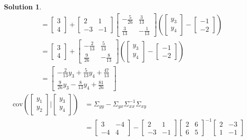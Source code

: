 \documentclass[11pt]{article}
\newtheorem{sol}{Solution}
\begin{document}
\begin{sol}
\begin{align*}
		&= \left[\begin{array}{c} 3\\ 4\end{array}\right] + \left[\begin{array}{cc} 2& 1\\ -3&-1 \end{array}\right]\left[\begin{array}{cc} -\frac{5}{26}& \frac{3}{13}\\ \frac{3}{13}&-\frac{1}{13} \end{array}\right](\left[\begin{array}{c} y_3\\ y_4\end{array}\right] - \left[\begin{array}{c} -1\\ -2\end{array}\right])\\
		&= \left[\begin{array}{c} 3\\ 4\end{array}\right] +  \left[\begin{array}{cc}-\frac{2}{13} & \frac{5}{13}\\ \frac{9}{26}&-\frac{8}{13} \end{array}\right](\left[\begin{array}{c} y_3\\ y_4\end{array}\right] - \left[\begin{array}{c} -1\\ -2\end{array}\right])\\
		&= \left[\begin{array}{c} -\frac{2}{13}y_3 + \frac{5}{13}y_4 + \frac{47}{13}\\ \frac{9}{26}y_3 - \frac{8}{13}y_4 + \frac{81}{26} \end{array}\right]
	\end{align*}
	\begin{align*}
		\text{cov}(\left[\begin{array}{c} y_1\\ y_2\end{array}\right]|\left[\begin{array}{c} y_3\\ y_4\end{array}\right]) &= \Sigma_{yy} - \Sigma_{yx}\Sigma_{xx}^{-1}\Sigma_{xy}\\
		&=  \left[\begin{array}{cc} 3&-4 \\ -4& 4\end{array}\right] - \left[\begin{array}{cc} 2& 1\\ -3&-1 \end{array}\right]\left[\begin{array}{cc} 2& 6\\ 6&5 \end{array}\right]^{-1}\left[\begin{array}{cc}2 &-3 \\ 1& -1\end{array}\right]\\

\end{align*}
\end{sol}
\end{document}
